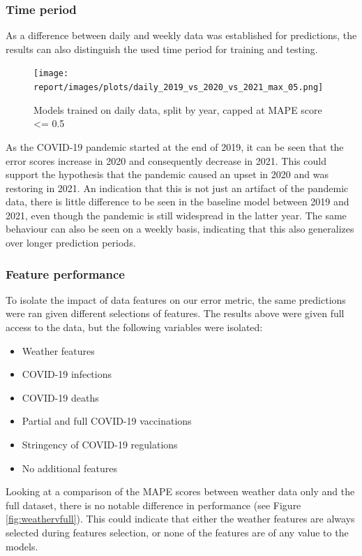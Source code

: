 \subsubsection{Time period}
As a difference between daily and weekly data was established for predictions, the results can also distinguish the used time period for training and testing.

\begin{figure}[H]
    \texttt{[image: report/images/plots/daily\_2019\_vs\_2020\_vs\_2021\_max\_05.png]}
    \caption{Models trained on daily data, split by year, capped at MAPE score <= 0.5}
    \label{fig:yearplot}
\end{figure}

As the COVID-19 pandemic started at the end of 2019, it can be seen that the error scores increase in 2020 and consequently decrease in 2021. This could support the hypothesis that the pandemic caused an upset in 2020 and was restoring in 2021. An indication that this is not just an artifact of the pandemic data, there is little difference to be seen in the baseline model between 2019 and 2021, even though the pandemic is still widespread in the latter year. The same behaviour can also be seen on a weekly basis, indicating that this also generalizes over longer prediction periods.

\subsubsection{Feature performance}
To isolate the impact of data features on our error metric, the same predictions were ran given different selections of features. The results above were given full access to the data, but the following variables were isolated:

\begin{itemize}
    \item Weather features
    \item COVID-19 infections
    \item COVID-19 deaths
    \item Partial and full COVID-19 vaccinations
    \item Stringency of COVID-19 regulations \cite{hale2020variation}
    \item No additional features
\end{itemize}

Looking at a comparison of the MAPE scores between weather data only and the full dataset, there is no notable difference in performance (see Figure \ref{fig:weathervfull}). This could indicate that either the weather features are always selected during features selection, or none of the features are of any value to the models.

